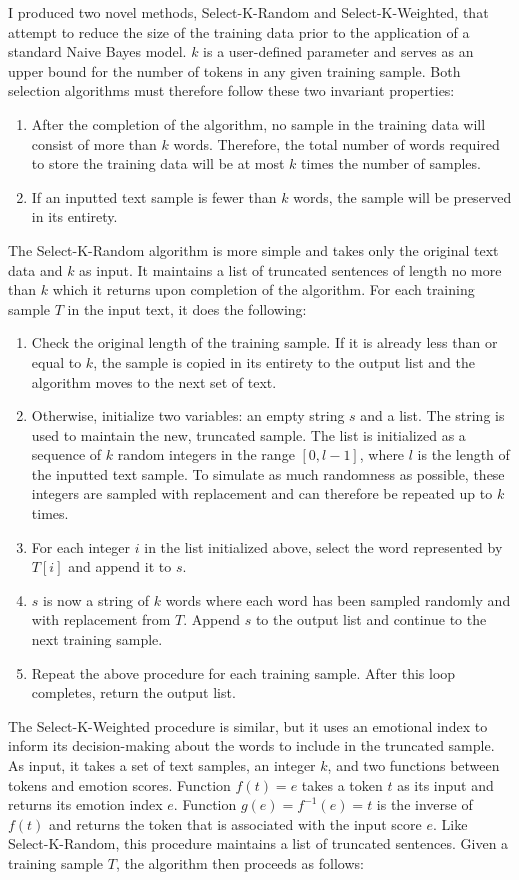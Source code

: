 \documentclass[11pt]{article}
\begin{document}
I produced two novel methods, Select-K-Random and Select-K-Weighted, that attempt to reduce the size of the training data prior to the application of a standard Naive Bayes model. $k$ is a user-defined parameter and serves as an upper bound for the number of tokens in any given training sample. Both selection algorithms must therefore follow these two invariant properties:
\begin{enumerate}
    \item After the completion of the algorithm, no sample in the training data will consist of more than $k$ words. Therefore, the total number of words required to store the training data will be at most $k$ times the number of samples.
    \item If an inputted text sample is fewer than $k$ words, the sample will be preserved in its entirety.
\end{enumerate}
The Select-K-Random algorithm is more simple and takes only the original text data and $k$ as input. It maintains a list of truncated sentences of length no more than $k$ which it returns upon completion of the algorithm. For each training sample $T$ in the input text, it does the following:
\begin{enumerate}
    \item Check the original length of the training sample. If it is already less than or equal to $k$, the sample is copied in its entirety to the output list and the algorithm moves to the next set of text.
    \item Otherwise, initialize two variables: an empty string $s$ and a list. The string is used to maintain the new, truncated sample. The list is initialized as a sequence of $k$ random integers in the range $[0, l-1]$, where $l$ is the length of the inputted text sample. To simulate as much randomness as possible, these integers are sampled with replacement and can therefore be repeated up to $k$ times.
    \item For each integer $i$ in the list initialized above, select the word represented by $T[i]$ and append it to $s$.
    \item $s$ is now a string of $k$ words where each word has been sampled randomly and with replacement from $T$. Append $s$ to the output list and continue to the next training sample.
    \item Repeat the above procedure for each training sample. After this loop completes, return the output list.
\end{enumerate}
The Select-K-Weighted procedure is similar, but it uses an emotional index to inform its decision-making about the words to include in the truncated sample. As input, it takes a set of text samples, an integer $k$, and two functions between tokens and emotion scores. Function $f(t) = e$ takes a token $t$ as its input and returns its emotion index $e$. Function $g(e) = f^{-1}(e) = t$ is the inverse of $f(t)$ and returns the token that is associated with the input score $e$. Like Select-K-Random, this procedure maintains a list of truncated sentences. Given a training sample $T$, the algorithm then proceeds as follows:
\end{document}
